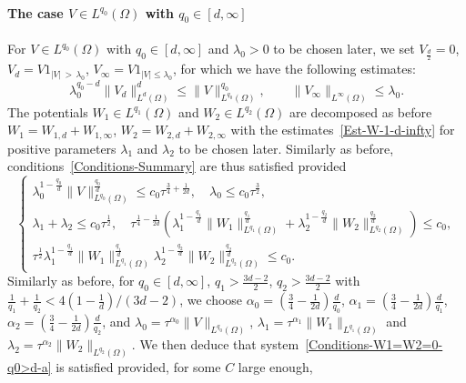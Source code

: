 \documentclass[10pt]{amsart}
\theoremstyle{definition}\newtheorem{defi}[theo]{Definition}\newtheorem{rema}[theo]{Remark}\newtheorem{exam}[theo]{Example}\newtheorem{exem}[theo]{Example}\newtheorem{nota}[theo]{Notation}
\newcommand*\ds{\displaystyle}
\renewcommand{\leq}{\leqslant}
\begin{document}
\paragraph{The case $V \in L^{q_0}(\Omega)$ with $q_0 \in [d,\infty]$}
For $V \in L^{q_0}(\Omega)$ with $q_0 \in [d, \infty]$ and $\lambda_0>0$ to be chosen later, we set $V_{\frac{d}{2}} = 0$, $V_d = V 1_{|V|\,>\,\lambda_0}$, $V_\infty = V 1_{|V| \leq \lambda_0}$, for which we have the following estimates:
\[
\lambda_0^{q_0-d} \| V_{d}\|_{L^{d}(\Omega)}^{d} \leq \| V \|_{L^{q_0}(\Omega)}^{q_0},
\qquad
\| V_{\infty} \|_{L^\infty(\Omega)} \leq \lambda_0.
\]
The potentials $W_1 \in L^{q_1}(\Omega)$ and $W_2 \in L^{q_2}(\Omega)$ are decomposed as before $W_1 = W_{1,d} + W_{1, \infty}$, $W_2 = W_{2,d} + W_{2, \infty}$ with the estimates~\eqref{Est-W-1-d-infty} for positive parameters $\lambda_1$ and $\lambda_2$ to be chosen later. Similarly as before, conditions~\eqref{Conditions-Summary} are thus satisfied provided
\begin{equation}\label{Conditions-W1=W2=0-q0>d-a}
\left\{
\begin{array}{l}
\ds
\lambda_0^{1-\frac{q_0}{d}} \| V \|_{L^{q_0}(\Omega)}^{\frac{q_0}{d}} \leq c_0 \tau^{\frac{3}{4}+\frac{1}{2d}},
\quad
\lambda_0 \leq c_0 \tau^{\frac{3}{2}},
\\[0.15em]
\ds
\lambda_1 + \lambda_2 \leq c_0 \tau^{\frac{1}{2}}, \quad
\tau^{\frac{1}{4}-\frac{1}{2d}} \left(\lambda_1^{1- \frac{q_1}{d}} \| W_{1} \|_{L^{q_1}(\Omega)}^{ \frac{q_1}{d}} + \lambda_2^{1- \frac{q_2}{d}} \| W_{2} \|_{L^{q_2}(\Omega)}^{ \frac{q_2}{d}}\right) \leq c_0,
\\[0.15em]
\ds \tau^{\frac{1}{2}} \lambda_1^{1- \frac{q_1}{d}} \| W_{1} \|_{L^{q_1}(\Omega)}^{ \frac{q_1}{d}} \lambda_2^{1- \frac{q_2}{d}} \| W_{2} \|_{L^{q_2}(\Omega)}^{ \frac{q_2}{d}} \leq c_0.
\end{array}\right.
\end{equation}
Similarly as before, for $q_0 \in [d, \infty]$, $q_1 > \frac{3d-2}{2} $, $q_2 > \frac{3d-2}{2} $ with $\frac{1}{q_1} +\frac{1}{q_2} < 4(1-\frac{1}{d})/(3d -2)$, we choose $\alpha_0 = (\frac{3}{4} - \frac{1}{2d})\frac{d}{q_0}$, $\alpha_1 = (\frac{3}{4} - \frac{1}{2d}) \frac{d}{q_1}$, $\alpha_2 = (\frac{3}{4} - \frac{1}{2d}) \frac{d}{q_2}$, and $\lambda_0 = \tau^{\alpha_0} \| V\|_{L^{q_0}(\Omega)}$, $\lambda_1 = \tau^{\alpha_1} \| W_1 \|_{L^{q_1}(\Omega)}$ and $\lambda_2 = \tau^{\alpha_2} \| W_2 \|_{L^{q_2}(\Omega)}$. We then deduce that system~\eqref{Conditions-W1=W2=0-q0>d-a} is satisfied provided, for some $C$ large enough,
\end{document}
